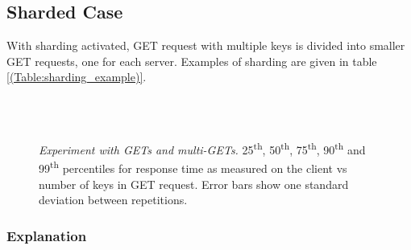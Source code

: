 \documentclass[11pt,a4paper]{article}
\begin{document}
\subsection{Sharded Case}

With sharding activated, GET request with multiple keys is divided into smaller GET requests, one for each server. Examples of sharding are given in table \ref{(Table:sharding_example)}.

\begin{figure}[ht!]
	\centering	
	\\
	\\
	\caption{\textit{Experiment with GETs and multi-GETs.} 25\textsuperscript{th}, 50\textsuperscript{th}, 75\textsuperscript{th}, 90\textsuperscript{th} and 99\textsuperscript{th} percentiles for response time as measured on the client vs number of keys in GET request. Error bars show one standard deviation between repetitions.}
	\label{Figure:experiment_gets_all}	
\end{figure}

\subsubsection{Explanation}
\end{document}
